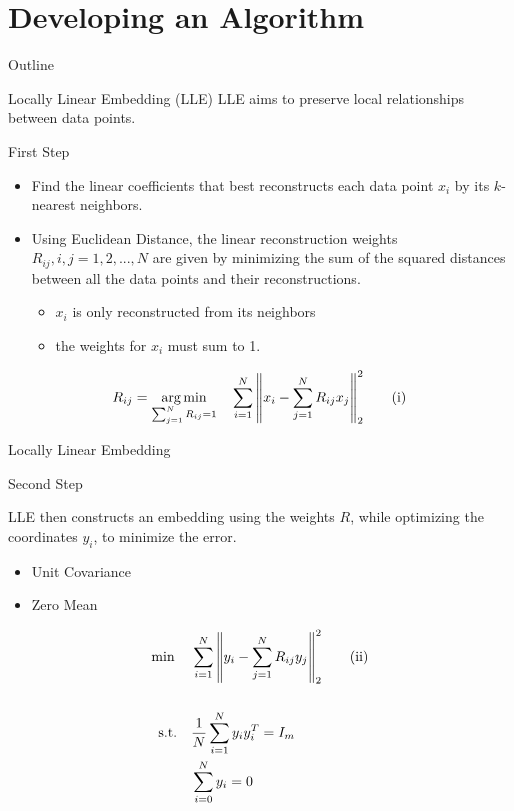 \documentclass{beamer}
\DeclareMathOperator*{\argmin}{arg\,min}
\begin{document}
\section[Developing an Algorithm]{Developing an Algorithm}
\begin{frame}{Outline}
\tableofcontents[current]
\end{frame}

\begin{frame}{Locally Linear Embedding (LLE)}
LLE aims to preserve local relationships between data points.
\begin{block}{First Step}
\begin{itemize}[<+->]
    \item Find the linear coefficients that best reconstructs each data point $x_i$ by its $k$-nearest neighbors. 
    \item Using Euclidean Distance, the linear reconstruction weights $R_{ij}, i,j=1,2,...,N$ are given by minimizing the sum of the squared distances between all the data points and their reconstructions.
    \begin{itemize}
        \item $x_i$ is only reconstructed from its neighbors
        \item the weights for $x_i$ must sum to 1. 
    \end{itemize}
\end{itemize}
\pause
\[R_{ij} = \argmin_{\sum_{j=1}^N{R_{ij}}=1}\quad\sum_{i=1}^N{\norm{x_i - \sum_{j=1}^N{R_{ij}x_j}}}_{2}^2 \tag{i}\]
\end{block}    
\end{frame}


\begin{frame}{Locally Linear Embedding}
\begin{block}{Second Step}
    \par LLE then constructs an embedding using the weights $R$, while optimizing the coordinates $y_i$, to minimize the error.
    \begin{itemize}
        \item Unit Covariance
        \item Zero Mean
    \end{itemize}
\begin{align*}
    \min{} \quad &\sum_{i=1}^N{\norm{y_i-\sum_{j=1}^N{R_{ij}y_j}}_2^2} \tag{ii}\\
    \\
    \text{s.t.} \quad &\frac{1}{N}\sum_{i=1}^N{y_iy_i^T=I_m} \\
    & \sum_{i=0}^{N}{y_i}=0
\end{align*}
\end{block}
\end{frame}
\end{document}
